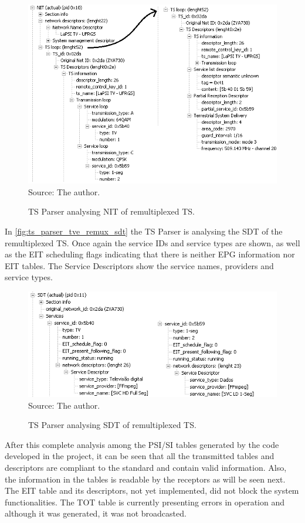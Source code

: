 \documentclass[
	12pt,				%
	openright,			%
	twoside,			%
	a4paper,			%
	brazil,
	french,				%
	english
	]{abntex2}
\begin{document}
\begin{figure}[!h]
\centering
\caption{TS Parser analysing NIT of remultiplexed TS.}
\includegraphics[width=0.9\linewidth]{figuras/ts_parser_tve_remux_nit.png}
\\Source: The author.
\label{fig:ts_parser_tve_remux_nit}
\end{figure}

In \autoref{fig:ts_parser_tve_remux_sdt} the TS Parser is analysing the SDT of the remultiplexed TS. Once again the service IDs and service types are shown, as well as the EIT scheduling flags indicating that there is neither EPG information nor EIT tables. The Service Descriptors show the service names, providers and service types.

\begin{figure}[!h]
\centering
\caption{TS Parser analysing SDT of remultiplexed TS.}
\includegraphics[width=0.9\linewidth]{figuras/ts_parser_tve_remux_sdt.png}
\\Source: The author.
\label{fig:ts_parser_tve_remux_sdt}
\end{figure}

After this complete analysis among the PSI/SI tables generated by the code developed in the project, it can be seen that all the transmitted tables and descriptors are compliant to the standard and contain valid information. Also, the information in the tables is readable by the receptors as will be seen next. The EIT table and its descriptors, not yet implemented, did not block the system functionalities. The TOT table is currently presenting errors in operation and although it was generated, it was not broadcasted.
\end{document}
